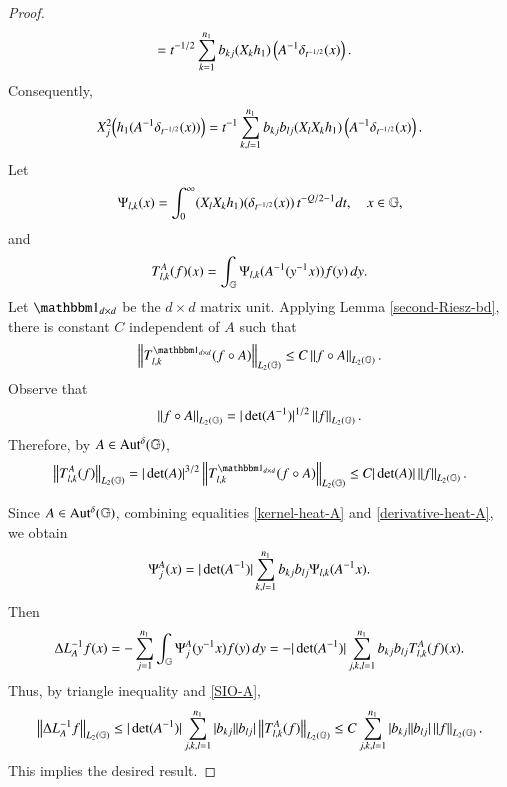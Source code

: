 \documentclass[leqno]{amsart}
\begin{document}
\begin{proof}
\begin{align*}
			&=t^{-1/2}\sum_{k=1}^{n_{1}}b_{kj}(X_{k}h_{1})\left(A^{-1}\delta_{t^{-1/2}}(x)\right).
		\end{align*}
Consequently,
		\begin{align}\label{derivative-heat-A}
			X_{j}^{2}\Big(h_{1}(A^{-1}\delta_{t^{-1/2}}(x))\Big)
			=t^{-1}\sum_{k,l=1}^{n_{1}}b_{kj}b_{lj}(X_{l}X_{k}h_{1})\left(A^{-1}\delta_{t^{-1/2}}(x)\right).
		\end{align}
		Let
		\begin{align*}
			\Psi_{l,k}(x)=\int_{0}^{\infty}(X_{l}X_{k}h_{1})(\delta_{t^{-1/2}}(x))\,t^{-Q/2-1}dt,\quad x\in\mathbb{G},
		\end{align*}
		and
		\begin{align*}
			T^{A}_{l,k}(f)(x)=\int_{\mathbb{G}}\Psi_{l,k}(A^{-1} (y^{-1} x))f(y)\,dy.
		\end{align*}
		Let $\unit_{d\times d}$ be the $d\times d$ matrix unit. 
		Applying Lemma \ref{second-Riesz-bd}, there is constant $C$ independent of $A$ such that
		\begin{align*}
			\Norm{T^{\unit_{d\times d}}_{l,k}(f\circ A)}_{\lp{2}}
			\leq C \Norm{f\circ A}_{\lp{2}}.
		\end{align*}
		Observe that
		\begin{align*}
			\left\| f\circ A \right\|_{L_{2}(\mathbb{G})}=|\det(A^{-1})|^{1/2}\left\| f \right\|_{L_{2}(\mathbb{G})}.
		\end{align*}
		Therefore, by $A\in{\rm Aut^{\delta}}(\mathbb{G})$,
		\begin{align}\label{SIO-A}
			\Norm{T^{A}_{l,k}(f)}_{\lp{2}}
			=|\det(A)|^{3/2}\Norm{T^{\unit_{d\times d}}_{l,k}(f\circ A)}_{\lp{2}}
			\leq C |\det(A)|\Norm{f}_{\lp{2}}.
		\end{align}
		
		
		Since $A\in{\rm Aut^{\delta}}(\mathbb{G})$, combining equalities \eqref{kernel-heat-A} and \eqref{derivative-heat-A}, we obtain %
		\begin{align*}
			\Psi^{A}_{j}(x)=|\det(A^{-1})|\sum_{k,l=1}^{n_{1}}b_{kj}b_{lj}\Psi_{l,k}(A^{-1} x).
		\end{align*}
		Then
		\begin{align*}
			\Delta L_{A}^{-1}f(x)=-\sum_{j=1}^{n_{1}}\int_{\mathbb{G}}\Psi^{A}_{j}(y^{-1} x)f(y)\,dy
			=-|\det(A^{-1})|\sum_{j,k,l=1}^{n_{1}}b_{kj}b_{lj} T^{A}_{l,k}(f)(x).
		\end{align*}
		Thus, by triangle inequality and \eqref{SIO-A},
		\begin{align*}
			\left\| \Delta L_{A}^{-1}f \right\|_{L_{2}(\mathbb{G})}
			\leq|\det(A^{-1})|\sum_{j,k,l=1}^{n_{1}}|b_{kj}||b_{lj}| \left\| T^{A}_{l,k}(f) \right\|_{L_{2}(\mathbb{G})}
			\leq C \sum_{j,k,l=1}^{n_{1}}|b_{kj}||b_{lj}| \left\| f \right\|_{L_{2}(\mathbb{G})}.
		\end{align*}
		This implies the desired result.
	\end{proof}
	
\end{document}
